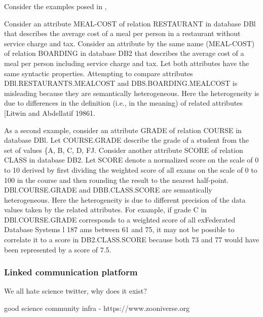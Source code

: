 \documentclass[nohyper]{tufte-book-jls}
\begin{document}
Consider the examples posed in \cite{shethFederatedDatabaseSystems1990},\begin{leftbar}Consider an attribute MEAL-COST of relation RESTAURANT in database DBl
that describes the average cost of a meal per person in a restaurant
without service charge and tax. Consider an attribute by the same name
(MEAL-COST) of relation BOARDING in database DB2 that describes the
average cost of a meal per person including service charge and tax. Let
both attributes have the same syntactic properties. Attempting to
compare attributes DBl.RESTAURANTS.MEALCOST and DBS.BOARDING.MEALCOST is
misleading because they are semantically heterogeneous. Here the
heterogeneity is due to differences in the definition (i.e., in the
meaning) of related attributes {[}Litwin and Abdellatif 19861.

As a second example, consider an attribute GRADE of relation COURSE in
database DBl. Let COURSE.GRADE describe the grade of a student from the
set of values \{A, B, C, D, FJ. Consider another attribute SCORE of
relation CLASS in database DB2. Let SCORE denote a normalized score on
the scale of 0 to 10 derived by first dividing the weighted score of all
exams on the scale of 0 to 100 in the course and then rounding the
result to the nearest half-point. DBl.COURSE.GRADE and DBB.CLASS.SCORE
are semantically heterogeneous. Here the heterogeneity is due to
different precision of the data values taken by the related attributes.
For example, if grade C in DBl.COURSE.GRADE corresponds to a weighted
score of all exFederated Database Systems l 187 ams between 61 and 75,
it may not be possible to correlate it to a score in DB2.CLASS.SCORE
because both 73 and 77 would have been represented by a score of 7.5.
\end{leftbar}

\hypertarget{linked-communication-platform}{%
\subsubsection{Linked communication
platform}\label{linked-communication-platform}}

We all hate science twitter, why does it exist?

good science community infra - https://www.zooniverse.org
\end{document}

